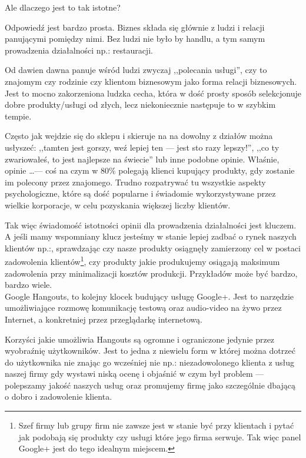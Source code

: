 Ale dlaczego jest to tak istotne?

Odpowiedź jest bardzo prosta. Biznes składa się głównie z ludzi i relacji panującymi pomiędzy nimi. Bez ludzi nie było by handlu, a tym samym prowadzenia działalności np.: restauracji.

Od dawien dawna panuje wśród ludzi zwyczaj ,,polecania usługi'', czy to znajomym czy rodzinie czy klientom biznesowym jako forma relacji biznesowych. Jest to mocno zakorzeniona ludzka cecha, która w dość prosty sposób selekcjonuje dobre produkty/usługi od złych, lecz niekoniecznie następuje to w szybkim tempie.

Często jak wejdzie się do sklepu i skieruje na na dowolny z działów można usłyszeć: ,,tamten jest gorszy, weź lepiej ten --- jest sto razy lepszy!'', ,,co ty zwariowałeś, to jest najlepsze na świecie'' lub inne podobne opinie. Właśnie, opinie \dots --- coś na czym w 80\% polegają klienci kupujący produkty, gdy zostanie im polecony przez znajomego. Trudno rozpatrywać tu wszystkie aspekty psychologiczne, które są dość popularne i świadomie wykorzystywane przez wielkie korporacje, w celu pozyskania większej liczby klientów.

Tak więc świadomość istotności opinii dla prowadzenia działalności jest kluczem. A jeśli mamy wspomniany klucz jesteśmy w stanie lepiej zadbać o rynek naszych klientów np.:, sprawdzając czy nasze produkty osiągnęły zamierzony cel w postaci zadowolenia klientów\footnote{Szef firmy lub grupy firm nie zawsze jest w stanie być przy klientach i pytać jak podobają się produkty czy usługi które jego firma serwuje. Tak więc panel Google+ jest do tego idealnym miejscem.}, czy produkty jakie produkujemy osiągają maksimum zadowolenia przy minimalizacji kosztów produkcji. Przykładów może być bardzo, bardzo wiele.\\

Google Hangouts, to kolejny klocek budujący usługę Google+. Jest to narzędzie umożliwiające rozmowę komunikację testową oraz audio-video na żywo przez Internet, a konkretniej przez przeglądarkę internetową.

Korzyści jakie umożliwia Hangouts są ogromne i ograniczone jedynie przez wyobraźnię użytkowników. Jest to jedna z niewielu form w której można dotrzeć do użytkownika nie znając go wcześniej nie np.: niezadowolonego klienta z usług naszej firmy gdy wystawi niską ocenę i objaśnić w czym był problem --- polepszamy jakość naszych usług oraz promujemy firmę jako szczególnie dbającą o dobro i zadowolenie klienta.

